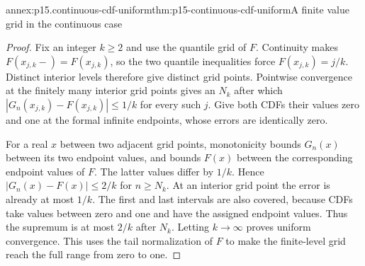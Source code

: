\begin{annexitem}{annex:p15.continuous-cdf-uniform}{thm:p15-continuous-cdf-uniform}{A finite value grid in the continuous case}
\begin{proof}
Fix an integer \(k\geq2\) and use the quantile grid of \(F\).
Continuity makes \(F(x_{j,k}-)=F(x_{j,k})\), so the two
quantile inequalities force \(F(x_{j,k})=j/k\).
Distinct interior levels therefore give distinct grid points.
Pointwise convergence at the finitely many interior grid points
gives an \(N_k\) after which
\(|G_n(x_{j,k})-F(x_{j,k})|\leq1/k\) for every such \(j\).
Give both CDFs their values zero and one at the formal infinite
endpoints, whose errors are identically zero.

For a real \(x\) between two adjacent grid points, monotonicity
bounds \(G_n(x)\) between its two endpoint values, and bounds
\(F(x)\) between the corresponding endpoint values of \(F\).
The latter values differ by \(1/k\). Hence
\(|G_n(x)-F(x)|\leq2/k\) for \(n\geq N_k\).
At an interior grid point the error is already at most \(1/k\).
The first and last intervals are also covered, because CDFs take
values between zero and one and have the assigned endpoint values.
Thus the supremum is at most \(2/k\) after \(N_k\).
Letting \(k\to\infty\) proves uniform convergence.
This uses the tail normalization of \(F\) to make the finite-level
grid reach the full range from zero to one.
\end{proof}
\end{annexitem}

